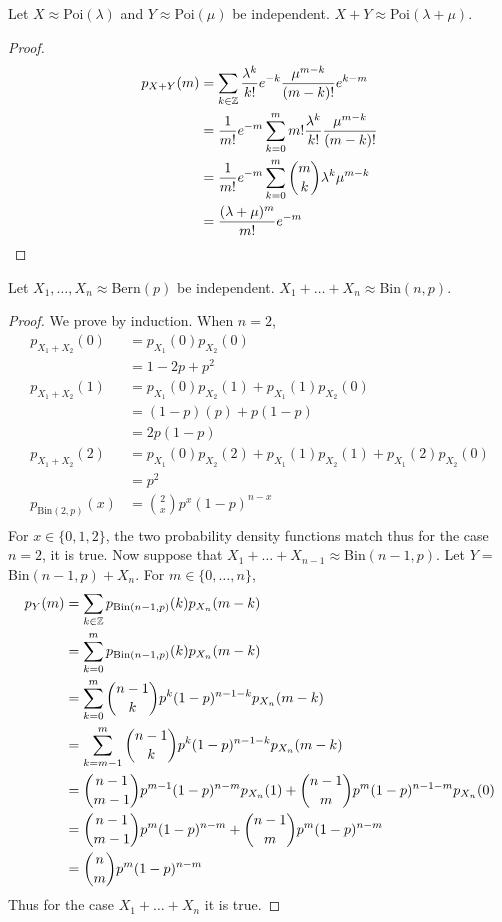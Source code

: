 \documentclass[a4paper]{article}
\begin{document}
\begin{prp}{}{} Let $X\approx$Poi$(\lambda)$ and $Y\approx$Poi$(\mu)$ be independent. $X+Y\approx$Poi$(\lambda+\mu)$. 
\end{prp}
\begin{proof} 
\begin{align*}
p_{X+Y}(m)&=\sum_{k\in\mathbb{Z}}\frac{\lambda^k}{k!}e^{-k}\frac{\mu^{m-k}}{(m-k)!}e^{k-m}\\
&=\frac{1}{m!}e^{-m}\sum_{k=0}^mm!\frac{\lambda^k}{k!}\frac{\mu^{m-k}}{(m-k)!}\\
&=\frac{1}{m!}e^{-m}\sum_{k=0}^m\binom{m}{k}\lambda^k\mu^{m-k}\\
&=\frac{(\lambda+\mu)^m}{m!}e^{-m}
\end{align*}
\end{proof}

\begin{prp}{}{} Let $X_1,\dots,X_n\approx$Bern$(p)$ be independent. $X_1+\dots+X_n\approx$Bin$(n,p)$. 
\end{prp}
\begin{proof} We prove by induction. When $n=2$,
\begin{align*}
p_{X_1+X_2}(0)&=p_{X_1}(0)p_{X_2}(0)\\
&=1-2p+p^2\\
p_{X_1+X_2}(1)&=p_{X_1}(0)p_{X_2}(1)+p_{X_1}(1)p_{X_2}(0)\\
&=(1-p)(p)+p(1-p)\\
&=2p(1-p)\\
p_{X_1+X_2}(2)&=p_{X_1}(0)p_{X_2}(2)+p_{X_1}(1)p_{X_2}(1)+p_{X_1}(2)p_{X_2}(0)\\
&=p^2\\
p_{\text{Bin}(2,p)}(x)&=\binom{2}{x}p^x(1-p)^{n-x}\\
\end{align*} For $x\in\{0,1,2\}$, the two probability density functions match thus for the case $n=2$, it is true. Now suppose that $X_1+\dots+X_{n-1}\approx$Bin$(n-1,p)$. Let $Y=$Bin$(n-1,p)+X_n$. For $m\in\{0,\dots,n\}$,
\begin{align*}
p_Y(m)&=\sum_{k\in\mathbb{Z}}p_{\text{Bin}(n-1,p)}(k)p_{X_n}(m-k)\\
&=\sum_{k=0}^mp_{\text{Bin}(n-1,p)}(k)p_{X_n}(m-k)\\
&=\sum_{k=0}^m\binom{n-1}{k}p^k(1-p)^{n-1-k}p_{X_n}(m-k)\\
&=\sum_{k=m-1}^m\binom{n-1}{k}p^k(1-p)^{n-1-k}p_{X_n}(m-k)\\
&=\binom{n-1}{m-1}p^{m-1}(1-p)^{n-m}p_{X_n}(1)+\binom{n-1}{m}p^m(1-p)^{n-1-m}p_{X_n}(0)\\
&=\binom{n-1}{m-1}p^{m}(1-p)^{n-m}+\binom{n-1}{m}p^m(1-p)^{n-m}\\
&=\binom{n}{m}p^{m}(1-p)^{n-m}
\end{align*} Thus for the case $X_1+\dots+X_n$ it is true. 
\end{proof}
\end{document}
